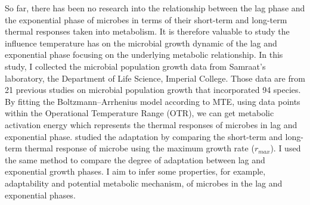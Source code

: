 \documentclass[a4paper]{article}
\begin{document}
So far, there has been no research into the relationship between the lag phase and the exponential phase of microbes in terms of their short-term and long-term thermal responses taken into metabolism. It is therefore valuable to study the influence temperature has on the microbial growth dynamic of the lag and exponential phase focusing on the underlying metabolic relationship. In this study, I collected the microbial population growth data from Samraat's laboratory, the Department of Life Science, Imperial College. Those data are from 21 previous studies on microbial population growth that incorporated 94 species. By fitting the Boltzmann–Arrhenius model according to MTE, using data points within the Operational Temperature Range (OTR), we can get metabolic activation energy which represents the thermal responses of microbes in lag and exponential phase. \citealt{smith2019community} studied the adaptation by comparing the short-term and long-term thermal response of microbe using the maximum growth rate ($r_{max}$). I used the same method to compare the degree of adaptation between lag and exponential growth phases. I aim to infer some properties, for example, adaptability and potential metabolic mechanism, of microbes in the lag and exponential phases. \\


\end{document}
